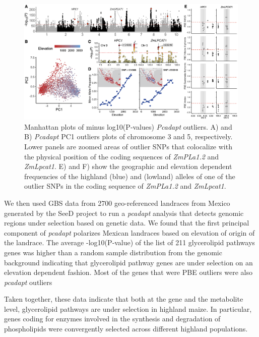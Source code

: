 \documentclass[9pt,twocolumn,twoside,lineno]{gsajnl}
\begin{document}
\begin{figure}[!ht]
\begin{center}
\includegraphics[width=0.4\paperwidth]{Figures/Fig_2.png}
\caption{Manhattan plots of minus log10(P‐values) \textit{Pcadapt} outliers. A) and B) \textit{Pcadapt} PC1 outliers plots of chromosome 3 and 5, respectively. 
Lower panels are zoomed areas of outlier SNPs that colocalize with the physical position of the coding sequences of \textit{ZmPLa1.2} and \textit{ZmLpcat1}. E) and F) show the geographic and elevation dependent frequencies of the highland (blue) and (lowland) alleles of one of the outlier SNPs in the coding sequence of \textit{ZmPLa1.2} and \textit{ZmLpcat1}. 
}
\label{pcadapt}
\end{center}
\end{figure} 

We then used GBS data from 2700 geo-referenced landraces from Mexico generated by the SeeD project \citep{Romero_Navarro2017-cn, Gates2019-we} to run a \textit{pcadapt} analysis that detects genomic regions under selection based on genetic data. We found that the first principal component of \textit{pcadapt} polarizes Mexican landraces based on elevation of origin of the landrace. 
The average -log10(P‐value) of the list of 211 glycerolipid pathways genes was higher than a random sample distribution from the genomic background indicating that glycerolipid pathway genes are under selection on an elevation dependent fashion. Most of the genes that were PBE outliers were also \textit{pcadapt} outliers     

Taken together, these data indicate that both at the gene and the metabolite level, glycerolipid pathways are under selection in highland maize. 
In particular, genes coding for enzymes involved in the synthesis and degradation of phospholipids were convergently selected across different highland populations. 
\end{document}
